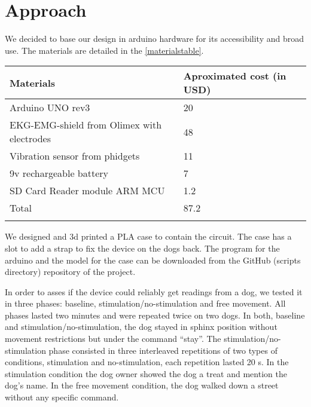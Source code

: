 \documentclass[twocolumn]{bmcart}%
\begin{document}
\section{Approach}\label{approach}

We decided to base our design in arduino hardware for its accessibility
and broad use. The materials are detailed in the \ref{materialstable}.

\begin{table*}[t!]
\caption{\label{materialstable} Materials and cost. The table shows most of the materials used and their approximated cost with a local provider. Other materials were used but their cost is negligible.}
\begin{tabular}{l l}
 \hline\noalign{\smallskip}
   Materials  & Aproximated cost (in USD) \\
    \hline\noalign{\smallskip}
  Arduino UNO rev3                  & 20    \\
  EKG-EMG-shield from Olimex with electrodes    & 48    \\
  Vibration sensor from phidgets            & 11    \\
  9v rechargeable battery               & 7 \\
  SD Card Reader module ARM MCU         & 1.2   \\
  Total                     & 87.2  \\
  \noalign{\smallskip}\hline
\end{tabular}
\end{table*}

We designed and 3d printed a PLA case to contain the circuit. The case
has a slot to add a strap to fix the device on the dogs back. The
program for the arduino and the model for the case can be downloaded
from the GitHub (scripts directory) repository of the project.

In order to asses if the device could reliably get readings from a dog,
we tested it in three phases: baseline, stimulation/no-stimulation and
free movement. All phases lasted two minutes and were repeated twice on
two dogs. In both, baseline and stimulation/no-stimulation, the dog
stayed in sphinx position without movement restrictions but under the
command ``stay''. The stimulation/no-stimulation phase consisted in
three interleaved repetitions of two types of conditions, stimulation
and no-stimulation, each repetition lasted 20 s. In the stimulation
condition the dog owner showed the dog a treat and mention the dog's
name. In the free movement condition, the dog walked down a street
without any specific command.
\end{document}
